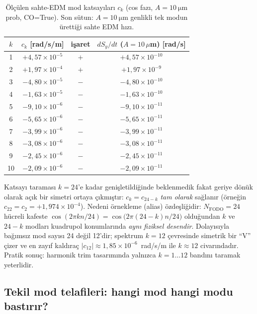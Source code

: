 \documentclass[preprint,12pt]{elsarticle}
\begin{document}
\begin{table}[h]
\centering
\caption{Ölçülen sahte-EDM mod katsayıları $c_k$ (cos fazı,
$A=\SI{10}{\micro\meter}$ prob, CO=True). Son sütun: $A=\SI{10}{\micro\meter}$
genlikli tek modun ürettiği sahte EDM hızı.}
\label{tab:ck}
\begin{tabular}{cccc}
\toprule
$k$ & $c_k$ [rad/s/m] & işaret & $dS_y/dt$ ($A{=}10\,\mu$m) [rad/s] \\
\midrule
1  & $+4{,}57\times10^{-5}$ & $+$ & $+4{,}57\times10^{-10}$ \\
2  & $+1{,}97\times10^{-4}$ & $+$ & $+1{,}97\times10^{-9}$ \\
3  & $-4{,}80\times10^{-5}$ & $-$ & $-4{,}80\times10^{-10}$ \\
4  & $-1{,}63\times10^{-5}$ & $-$ & $-1{,}63\times10^{-10}$ \\
5  & $-9{,}10\times10^{-6}$ & $-$ & $-9{,}10\times10^{-11}$ \\
6  & $-5{,}65\times10^{-6}$ & $-$ & $-5{,}65\times10^{-11}$ \\
7  & $-3{,}99\times10^{-6}$ & $-$ & $-3{,}99\times10^{-11}$ \\
8  & $-3{,}08\times10^{-6}$ & $-$ & $-3{,}08\times10^{-11}$ \\
9  & $-2{,}45\times10^{-6}$ & $-$ & $-2{,}45\times10^{-11}$ \\
10 & $-2{,}09\times10^{-6}$ & $-$ & $-2{,}09\times10^{-11}$ \\
\bottomrule
\end{tabular}
\end{table}

Katsayı taraması $k=24$'e kadar genişletildiğinde beklenmedik fakat
geriye dönük olarak açık bir simetri ortaya çıkmıştır:
$c_k = c_{24-k}$ \emph{tam olarak} sağlanır (örneğin
$c_{22}=c_2=+1{,}974\times10^{-4}$). Nedeni örnekleme (alias)
özdeşliğidir: $N_\mathrm{FODO}=24$ hücreli kafeste
$\cos(2\pi k n/24) = \cos\!\big(2\pi(24-k)n/24\big)$ olduğundan $k$ ve
$24-k$ modları kuadrupol konumlarında \emph{aynı fiziksel desendir}.
Dolayısıyla bağımsız mod sayısı 24 değil 12'dir; spektrum $k=12$
çevresinde simetrik bir ``V'' çizer ve en zayıf kaldıraç
$|c_{12}|\approx1{,}85\times10^{-6}$~rad/s/m ile $k\approx12$
civarındadır. Pratik sonuç: harmonik trim tasarımında yalnızca
$k=1\ldots12$ bandını taramak yeterlidir.

\subsection{Tekil mod telafileri: hangi mod hangi modu bastırır?}
\label{sec:trim-ortak}
\end{document}
